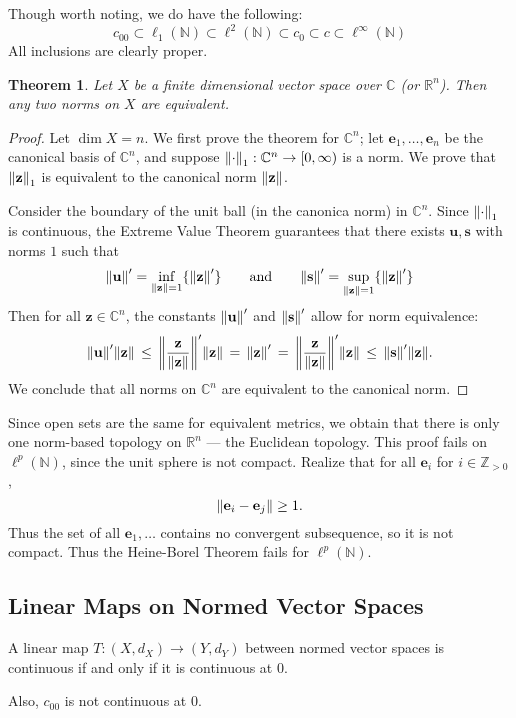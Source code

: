 \documentclass[11pt]{article}
\newtheorem{theorem}{Theorem}
\renewcommand{\vec}[1]{\mathbf{#1}}
\begin{document}
\newpage

Though worth noting, we do have the following:
\[
  c_{00} \subset \ell_{1}(\mathbb{N}) \subset \ell^{2}(\mathbb{N}) \subset c_{0} \subset c \subset \ell^{\infty}(\mathbb{N})
\]
All inclusions are clearly proper.

\begin{theorem}
  Let $X$ be a finite dimensional vector space over $\mathbb{C}$ (or $\mathbb{R}^{n}$). Then any two norms on $X$ are equivalent.
\end{theorem}
\begin{adjustwidth}{0.5cm}{}
  \begin{proof}
    Let $\dim X = n$. We first prove the theorem for $\mathbb{C}^{n}$; let $\vec{e}_{1}, \ldots, \vec{e}_{n}$ be the canonical basis of $\mathbb{C}^{n}$, and suppose $\norm{\cdot}_{1} : \mathbb{C}^{n} \to [0, \infty)$ is a norm. We prove that $\norm{\vec{z}}_{1}$ is equivalent to the canonical norm $\norm{\vec{z}}$.
    
    Consider the boundary of the unit ball (in the canonica norm) in $\mathbb{C}^{n}$. Since $\norm{\cdot}_{1}$ is continuous, the Extreme Value Theorem guarantees that there exists $\vec{u}, \vec{s}$ with norms $1$ such that 
    \[
      \norm{\vec{u}}' = \inf\limits_{\norm{\vec{z}} = 1} \{  \norm{\vec{z}}' \} \qquad \text{and} \qquad \norm{\vec{s}}' = \sup\limits_{\norm{\vec{z}} = 1} \{ \norm{\vec{z}}' \}
    \]
    Then for all $\vec{z} \in \mathbb{C}^{n}$, the constants $\norm{\vec{u}}'$ and $\norm{\vec{s}}'$ allow for norm equivalence:
    \[
      \norm{\vec{u}}' \norm{\vec{z}} \, \le \, \norm{\frac{\vec{z}}{\norm{\vec{z}}}}' \norm{\vec{z}} \, = \, \norm{\vec{z}}' \, = \, \norm{\frac{\vec{z}}{\norm{\vec{z}}}}' \norm{\vec{z}} \, \le \, \norm{\vec{s}}' \norm{\vec{z}}.
    \]
    We conclude that all norms on $\mathbb{C}^{n}$ are equivalent to the canonical norm.


  \end{proof}
\end{adjustwidth}

Since open sets are the same for equivalent metrics, we obtain that there is only one norm-based topology on $\mathbb{R}^{n}$ --- the Euclidean topology. This proof fails on $\ell^{p}(\mathbb{N})$, since the unit sphere is not compact. Realize that for all $\vec{e}_{i}$ for $i \in \mathbb{Z}_{> 0}$,
\[
  \norm{\vec{e}_{i} - \vec{e}_{j}} \ge 1.
\]
Thus the set of all $\vec{e}_{1}, \ldots$ contains no convergent subsequence, so it is not compact. Thus the Heine-Borel Theorem fails for $\ell^{p}(\mathbb{N})$.


\subsection{Linear Maps on Normed Vector Spaces}

A linear map $T : (X, d_{X}) \to (Y, d_{Y})$ between normed vector spaces is continuous if and only if it is continuous at $0$.

Also, $c_{00}$ is not continuous at $0$.

\end{document}
